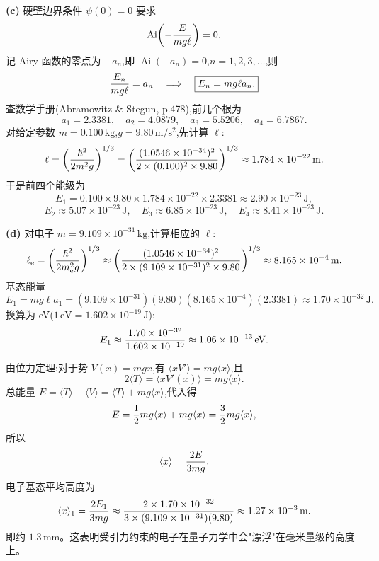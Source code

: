 \begin{question}
\begin{solution}
\textbf{(c)} 硬壁边界条件 $\psi(0)=0$ 要求
\[
\operatorname{Ai}\!\left(-{E\over mg\ell}\right)=0.
\]
记 Airy 函数的零点为 $-a_n$,即 $\operatorname{Ai}(-a_n)=0$,$n=1,2,3,\ldots$,则
\[
{E_n\over mg\ell}=a_n\quad\Longrightarrow\quad
\boxed{E_n=mg\ell a_n.}
\]
查数学手册(Abramowitz \& Stegun, p.478),前几个根为
\[
a_1=2.3381,\quad a_2=4.0879,\quad a_3=5.5206,\quad a_4=6.7867.
\]
对给定参数 $m=0.100\,\mathrm{kg}$,$g=9.80\,\mathrm{m/s^2}$,先计算 $\ell$:
\[
\ell=\left({\hbar^2\over2m^2g}\right)^{1/3}
=\left({(1.0546\times10^{-34})^2\over2\times(0.100)^2\times9.80}\right)^{1/3}
\approx 1.784\times10^{-22}\,\mathrm{m}.
\]
于是前四个能级为
\[
E_1=0.100\times9.80\times1.784\times10^{-22}\times2.3381
\approx 2.90\times10^{-23}\,\mathrm{J},
\]
\[
E_2\approx 5.07\times10^{-23}\,\mathrm{J},\quad
E_3\approx 6.85\times10^{-23}\,\mathrm{J},\quad
E_4\approx 8.41\times10^{-23}\,\mathrm{J}.
\]

\textbf{(d)} 对电子 $m=9.109\times10^{-31}\,\mathrm{kg}$,计算相应的 $\ell$:
\[
\ell_{\rm e}=\left({\hbar^2\over2m_{\rm e}^2g}\right)^{1/3}
\approx\left({(1.0546\times10^{-34})^2\over2\times(9.109\times10^{-31})^2\times9.80}\right)^{1/3}
\approx 8.165\times10^{-4}\,\mathrm{m}.
\]
基态能量
\[
E_1=mg\ell a_1
=(9.109\times10^{-31})(9.80)(8.165\times10^{-4})(2.3381)
\approx 1.70\times10^{-32}\,\mathrm{J}.
\]
换算为 eV($1\,\mathrm{eV}=1.602\times10^{-19}\,\mathrm{J}$):
\[
E_1\approx {1.70\times10^{-32}\over1.602\times10^{-19}}
\approx 1.06\times10^{-13}\,\mathrm{eV}.
\]

由位力定理:对于势 $V(x)=mgx$,有 $\langle xV'\rangle=mg\langle x\rangle$,且
\[
2\langle T\rangle=\langle xV'(x)\rangle=mg\langle x\rangle.
\]
总能量 $E=\langle T\rangle+\langle V\rangle=\langle T\rangle+mg\langle x\rangle$,代入得
\[
E={1\over2}mg\langle x\rangle+mg\langle x\rangle={3\over2}mg\langle x\rangle,
\]
所以
\[
\langle x\rangle={2E\over3mg}.
\]
电子基态平均高度为
\[
\langle x\rangle_1={2E_1\over3mg}
\approx{2\times1.70\times10^{-32}\over3\times(9.109\times10^{-31})(9.80)}
\approx 1.27\times10^{-3}\,\mathrm{m}.
\]
即约 $1.3\,\mathrm{mm}$。这表明受引力约束的电子在量子力学中会"漂浮"在毫米量级的高度上。
\end{solution}
\end{question}

